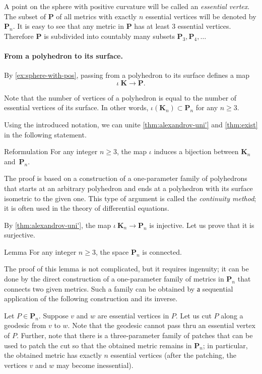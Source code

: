 A point on the sphere with positive curvature will be called an \emph{essential vertex}.
The subset of $\mathbf{P}$ of all metrics with exactly $n$ essential vertices will be denoted by $\mathbf{P}_n$.
It is easy to see that any metric in $\mathbf{P}$ has at least 3 essential vertices.
Therefore $\mathbf{P}$ is subdivided into countably many subsets
 $\mathbf{P}_3,\mathbf{P}_4,\dots$

\paragraph{From a polyhedron to its surface.}

By \ref{ex:sphere-with-pos}, passing from a polyhedron to its surface defines a map
\[\iota\:\mathbf{K}\to \mathbf{P}.\]

Note that the number of vertices of a polyhedron is equal to the number of essential vertices of its surface.
In other words, $\iota(\mathbf{K}_n)\subset \mathbf{P}_n$ for any $n\ge 3$.

Using the introduced notation, we can unite \ref{thm:alexandrov-uni'} and \ref{thm:exist} in the following statement.

\begin{thm}{Reformulation}
For any integer $n\ge 3$,
the map $\iota$ induces a bijection between $\mathbf{K}_n$ and~$\mathbf{P}_n$.
\end{thm}

The proof is based on a construction of a one-parameter family of polyhedrons that starts at an arbitrary polyhedron
and ends at a polyhedron with its surface isometric to the given one.
This type of argument is called the \emph{continuity method}; it is often used in the theory of differential equations.


By \ref{thm:alexandrov-uni'}, the map $\iota\:\mathbf{K}_n\to\mathbf{P}_n$ is injective.
Let us prove that it is surjective.

\begin{thm}{Lemma}
For any integer $n\ge 3$, the space $\mathbf{P}_n$ is connected.
\end{thm}

The proof of this lemma is not complicated, but it requires ingenuity;
it can be done by the direct construction of a one-parameter family of metrics in $\mathbf{P}_n$ that connects two given metrics.
Such a family can be obtained by а sequential application of the following construction and its inverse.

Let $P\in\mathbf{P}_n$.
Suppose $v$ and $w$ are essential vertices in $P$.
Let us cut $P$ along a geodesic from $v$ to $w$.
Note that the geodesic cannot pass thru an essential vertex of $P$.
Further, note that there is a three-parameter family of patches that can be used to patch the cut so that the obtained metric remains in $\mathbf{P}_n$;
in particular, the obtained metric has exactly $n$ essential vertices (after the patching, the vertices $v$ and $w$ may become inessential).


